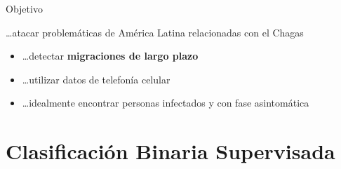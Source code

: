 \documentclass[xcolor=x11names]{beamer}
\begin{document}
\begin{frame}{Objetivo}
	\begin{block}{\ldots atacar problemáticas de América Latina relacionadas con el Chagas}


	\begin{itemize}
		\item \ldots detectar \textbf{migraciones de largo plazo} 
		\item \ldots utilizar datos de telefonía celular
		
		\item \ldots idealmente encontrar personas infectados y con fase asintomática
	\end{itemize}



	\end{block}
\end{frame}



\section{Clasificación Binaria Supervisada}
\end{document}
